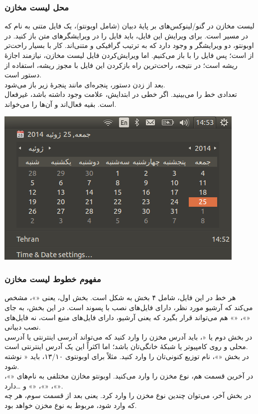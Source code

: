 \subsubsection{محل لیست مخازن}
لیست مخازن در گنو/لینوکس‌های بر پایهٔ دبیان (شامل اوبونتو)، یک فایل متنی به نام  که در مسیر  است. برای ویرایش این فایل، باید فایل را در ویرایشگرهای متن باز کنید. در اوبونتو، دو ویرایشگر  و  وجود دارد که به ترتیب گرافیکی و متنی‌اند. کار با  بسیار راحت‌تر از  است؛ پس فایل را با  باز می‌کنیم. اما ویرایش‌کردن فایل لیست مخازن، نیازمند اجازهٔ ریشه است؛ در نتیجه، راحت‌ترین راه بازکردن این فایل با مجوز ریشه، استفاده از دستور  است.\\
بعد از زدن دستور، پنجره‌ای مانند پنجرهٔ زیر باز می‌شود.\\
تعدادی خط را می‌بینید. اگر خطی در ابتدایش، علامت \lr{\texttt{\#}} وجود داشته باشد، غیرفعال است. بقیه فعال‌اند و  آن‌ها را می‌خواند.

\begin{center}
\includegraphics[scale=0.43]{pics/21.png}
\end{center}

\subsubsection{مفهوم خطوط لیست مخازن}
هر خط در این فایل، شامل ۴ بخش به شکل  است. بخش اول، یعنی «»، مشخص می‌کند که آرشیو مورد نظر، دارای فایل‌های نصب با پسوند  است. در این بخش، به جای «»، «» هم می‌تواند قرار بگیرد که یعنی آرشیو، دارای فایل‌های منبع است، نه فایل‌های نصب دبیانی.\\
در بخش دوم یا «، باید آدرس مخزن را وارد کنید که می‌تواند آدرسی اینترنتی یا آدرسی محلی و روی کامپیوتر یا شبکهٔ خانگی‌تان باشد؛ اما اکثراً این یک آدرس اینترنتی است.\\
در بخش «»، نام توزیع کنونی‌تان را وارد کنید. مثلاً برای اوبونتوی ۱۳/۱۰، باید « نوشته شود.\\
در آخرین قسمت هم، نوع مخزن را وارد می‌کنید. اوبونتو مخازن مختلفی به نام‌های «»، «»، «»، «» و \ldots دارد.\\
در بخش آخر، می‌توان چندین نوع مخزن را وارد کرد. یعنی بعد از قسمت سوم، هر چه که وارد شود، مربوط به نوع مخزن خواهد بود.

